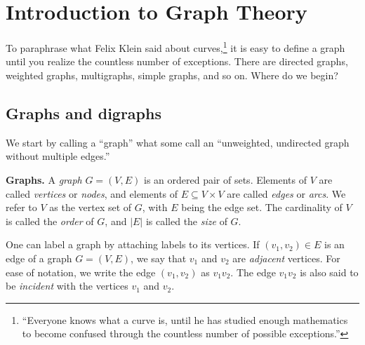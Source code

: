
\chapter{Introduction to Graph Theory}

To paraphrase what Felix Klein said about curves,\footnote{
``Everyone knows what a curve is, until he has studied enough
mathematics to become confused through the countless number of
possible exceptions.''}
it is easy to define a graph until you realize the countless number of
exceptions. There are directed graphs, weighted graphs, multigraphs,
simple graphs, and so on. Where do we begin?



\section{Graphs and digraphs}

We start by calling a ``graph'' what some call an ``unweighted,
undirected graph without multiple edges.''

\begin{definition}
\textbf{Graphs.}
A \emph{graph} $G = (V, E)$ is an ordered pair of sets. Elements of
$V$ are called \emph{vertices} or \emph{nodes}, and elements of
$E \subseteq V \times V$ are called \emph{edges} or \emph{arcs}. We
refer to $V$ as the vertex set of $G$, with $E$ being the edge
set. The cardinality of $V$ is called the \emph{order} of $G$, and
$|E|$ is called the \emph{size} of $G$.
\end{definition}

One can label a graph by attaching labels to its vertices. If $(v_1,
v_2) \in E$ is an edge of a graph $G = (V, E)$, we say that $v_1$ and
$v_2$ are \emph{adjacent} vertices. For ease of notation, we write the
edge $(v_1, v_2)$ as $v_1 v_2$. The edge $v_1 v_2$ is also said to be
\emph{incident} with the vertices $v_1$ and $v_2$.

